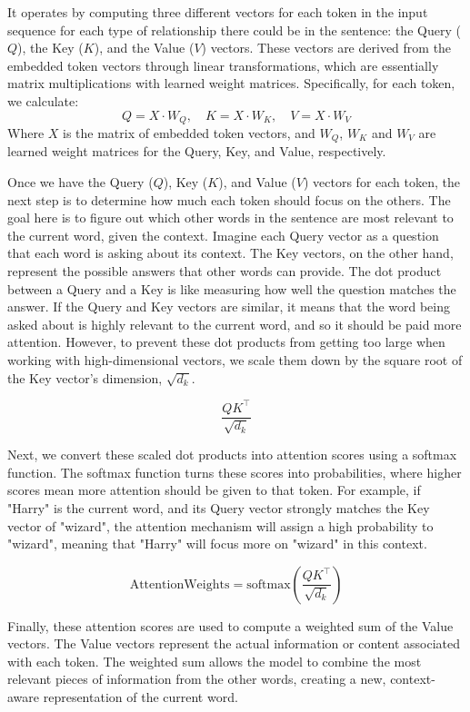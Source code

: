 \documentclass[11pt]{article}
\begin{document}
\iffalse
    It operates by computing three different vectors for each token in the input sequence for each type of relationship there could be in the sentence: the Query ($Q$), the Key ($K$), and the Value ($V$) vectors. These vectors are derived from the embedded token vectors through linear transformations, which are essentially matrix multiplications with learned weight matrices. Specifically, for each token, we calculate:
    $$Q = X \cdot W_Q,\quad K = X\cdot W_K,\quad V = X \cdot W_V$$
    Where $X$ is the matrix of embedded token vectors, and $W_Q$, $W_K$ and $W_V$ are learned weight matrices for the Query, Key, and Value, respectively.

    Once we have the Query ($Q$), Key ($K$), and Value ($V$) vectors for each token, the next step is to determine how much each token should focus on the others. The goal here is to figure out which other words in the sentence are most relevant to the current word, given the context.
    Imagine each Query vector as a question that each word is asking about its context. The Key vectors, on the other hand, represent the possible answers that other words can provide. The dot product between a Query and a Key is like measuring how well the question matches the answer. If the Query and Key vectors are similar, it means that the word being asked about is highly relevant to the current word, and so it should be paid more attention.
    However, to prevent these dot products from getting too large when working with high-dimensional vectors, we scale them down by the square root of the Key vector's dimension, $\sqrt{d_k}$.

    $$\frac{QK^\top}{\sqrt{d_k}}$$

    Next, we convert these scaled dot products into attention scores using a softmax function. The softmax function turns these scores into probabilities, where higher scores mean more attention should be given to that token. For example, if "Harry" is the current word, and its Query vector strongly matches the Key vector of "wizard", the attention mechanism will assign a high probability to "wizard", meaning that "Harry" will focus more on "wizard" in this context.

    $$\mathrm{Attention Weights} = \mathrm{softmax}\left(\frac{QK^\top}{\sqrt{d_k}}\right)$$

    Finally, these attention scores are used to compute a weighted sum of the Value vectors. The Value vectors represent the actual information or content associated with each token. The weighted sum allows the model to combine the most relevant pieces of information from the other words, creating a new, context-aware representation of the current word.
\end{document}
